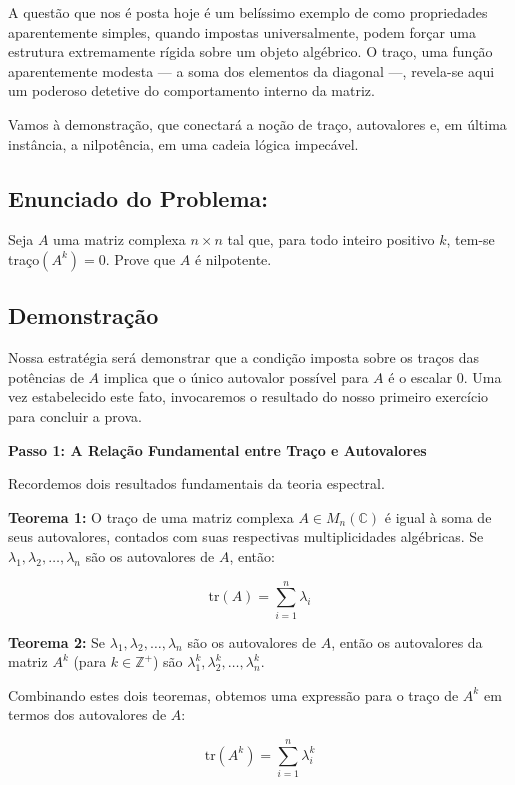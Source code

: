 A questão que nos é posta hoje é um belíssimo exemplo de como propriedades aparentemente
simples, quando impostas universalmente, podem forçar uma estrutura extremamente rígida sobre
um objeto algébrico. O traço, uma função aparentemente modesta — a soma dos elementos da
diagonal —, revela-se aqui um poderoso detetive do comportamento interno da matriz.

Vamos à demonstração, que conectará a noção de traço, autovalores e, em última instância, a
nilpotência, em uma cadeia lógica impecável.

\subsection*{Enunciado do Problema:}

Seja $A$ uma matriz complexa $n \times n$ tal que, para todo inteiro positivo $k$, tem-se traço$(A^k)=0$.
Prove que $A$ é nilpotente.

\subsection*{Demonstração}

Nossa estratégia será demonstrar que a condição imposta sobre os traços das potências de $A$
implica que o único autovalor possível para $A$ é o escalar $0$. Uma vez estabelecido este fato,
invocaremos o resultado do nosso primeiro exercício para concluir a prova.

\textbf{Passo 1: A Relação Fundamental entre Traço e Autovalores}

Recordemos dois resultados fundamentais da teoria espectral.

\textbf{Teorema 1:} O traço de uma matriz complexa $A \in M_n(\mathbb{C})$ é igual à soma de seus autovalores,
contados com suas respectivas multiplicidades algébricas.
Se $\lambda_1, \lambda_2, \ldots, \lambda_n$ são os autovalores de $A$, então:

\[
\mathrm{tr}(A) = \sum_{i=1}^n \lambda_i
\]

\textbf{Teorema 2:} Se $\lambda_1, \lambda_2, \ldots, \lambda_n$ são os autovalores de $A$, então os autovalores da matriz $A^k$ (para $k \in \mathbb{Z}^+$) são $\lambda_1^k, \lambda_2^k, \ldots, \lambda_n^k$.

Combinando estes dois teoremas, obtemos uma expressão para o traço de $A^k$ em termos dos
autovalores de $A$:

\[
\mathrm{tr}(A^k) = \sum_{i=1}^n \lambda_i^k
\]

